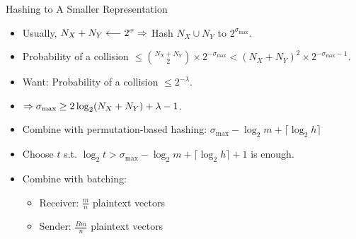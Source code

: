 \iffalse
\begin{frame}{Dummy Values}
\begin{itemize}
\item Uneven loads reveal additional information $\then$ Every bin must be padded to a fixed size.
\item Receiver and sender set two different dummy values from $\Z_t$ that are not legitimate values.
\end{itemize}
\end{frame}
\fi

\begin{frame}{Hashing to A Smaller Representation}
\begin{itemize}
\item Usually, $N_X+N_Y\longleftarrow2^\sigma\Rightarrow$ Hash $N_X\cup N_Y$ to $2^{\sigma_{\max}}$.
\item Probability of a collision $\leq\binom{N_X+N_Y}2\times2^{-\sigma_{\max}}<(N_X+N_Y)^2\times2^{-\sigma_{\max}-1}$.
\item Want: Probability of a collision $\leq2^{-\lambda}$.
\item $\Rightarrow\sigma_{\max}\geq2\log_2(N_X+N_Y)+\lambda-1$.
\item Combine with permutation-based hashing: $\sigma_{\max}-\log_2m+\lceil\log_2h\rceil$
\item Choose $t$ s.t. $\log_2t>\sigma_{\max}-\log_2m+\lceil\log_2h\rceil+1$ is enough.
\item Combine with batching:
\begin{itemize}
\item Receiver: $\frac mn$ plaintext vectors
\item Sender: $\frac{Bm}n$ plaintext vectors
\end{itemize}
\end{itemize}
\end{frame}

